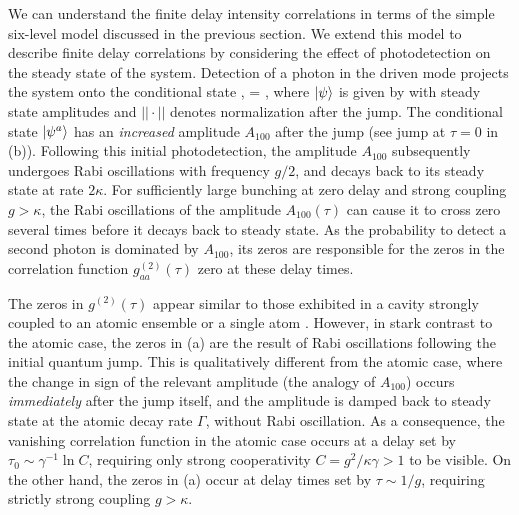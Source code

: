 We can understand the finite delay intensity
correlations
in terms of the simple six-level model discussed
in the previous section.
We extend
this model to describe finite delay correlations
by considering the effect of photodetection on
the steady state of the system.
Detection of a photon in the driven mode projects
the system onto the conditional state \cite{QuantumNoise},
\bel
	\label{eq:psi^a}
	 = ,
\eel
where $| \psi \rangle$ is given by  with steady state amplitudes
and $|| \cdot ||$ denotes normalization after the jump.
The conditional state $| \psi^a \rangle$ has an {\it increased}
amplitude $A_{100}$ after the jump
(see jump at $\tau = 0$ in  (b)).
Following this initial photodetection, the amplitude 
$A_{100}$
subsequently undergoes Rabi oscillations with frequency $g/2$,
and decays back to its steady state at rate $2\kappa$. 
For sufficiently large bunching at zero delay and
strong coupling $g > \kappa$, the  Rabi oscillations of the amplitude
$A_{100}(\tau)$ can cause it to cross zero 
several times before it decays back
to steady state.
As the probability to detect a second photon is dominated by $A_{100}$,
its zeros are responsible for the zeros in the correlation
function $g^{(2)}_{aa}(\tau)$ zero at these delay times.





The zeros in $g^{(2)}(\tau)$ appear similar
to those exhibited  in
a cavity strongly coupled to
an atomic ensemble \cite{Carmichael1991, Rice1988, Brecha1999} or a single atom
\cite{Chang2007}. 
However, in stark contrast to the atomic case,
the zeros in (a)
are the result of Rabi oscillations  following
the initial quantum jump.
This is qualitatively different from
the atomic case, where the change in
sign of the relevant amplitude (the analogy of $A_{100}$)
occurs {\it immediately} after the jump itself, and the amplitude
is damped back to steady state at the atomic
decay rate $\Gamma$, without Rabi oscillation. 
As a consequence, the vanishing correlation
function in the atomic case occurs
at a delay set by $\tau_0 \sim \gamma^{-1}\ln C$, 
requiring only strong cooperativity $C = g^2/ \kappa \gamma > 1$
to be visible.
On the other hand,
the zeros in (a)
occur at delay times set by  $\tau \sim 1/g$,
requiring strictly strong coupling $g > \kappa$.








